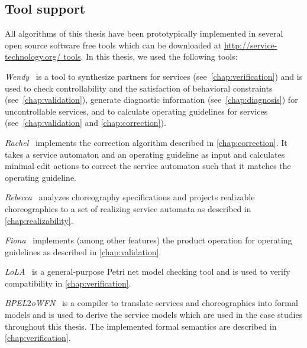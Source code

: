 \subsection*{Tool support}

All algorithms of this thesis have been prototypically implemented in several open source software free tools which can be downloaded at \href{http://service-technology.org/tools}{http:/\!/service-technology.org/ tools}. In this thesis, we used the following tools:

\begin{niceitemize}
\item \emph{Wendy}~\cite{LohmannW_2009_wendy} is a tool to synthesize partners for services (see~\autoref{chap:verification}) and is used to check controllability and the satisfaction of behavioral constraints (see~\autoref{chap:validation}), generate diagnostic information (see~\autoref{chap:diagnosis}) for uncontrollable services, and to calculate operating guidelines for services (see~\autoref{chap:validation} and \autoref{chap:correction}).
\item \emph{Rachel}~\cite{rachel} implements the correction algorithm described in \autoref{chap:correction}. It takes a service automaton and an operating guideline as input and calculates minimal edit actions to correct the service automaton such that it matches the operating guideline.
\item \emph{Rebecca}~\cite{rebecca} analyzes choreography specifications and projects realizable choreographies to a set of realizing service automata as described in \autoref{chap:realizability}. 
\item \emph{Fiona}~\cite{MassutheW_2008_awpn} implements (among other features) the product operation for operating guidelines as described in \autoref{chap:validation}.
\item \emph{LoLA}~\cite{Wolf_2007_icatpn} is a general-purpose Petri net model checking tool and is used to verify compatibility in \autoref{chap:verification}.
\item \emph{BPEL$\mathit{2}$oWFN}~\cite{Lohmann_2007_hubtr212} is a compiler to translate  services and \bpelchor{} choreographies into formal models and is used to derive the service models which are used in the case studies throughout this thesis. The implemented formal semantics are described in \autoref{chap:verification}.
\end{niceitemize}

